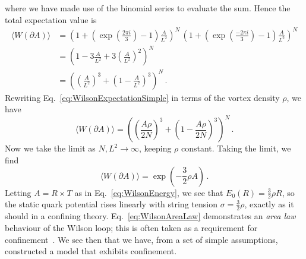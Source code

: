 %
where we have made use of the binomial series to evaluate the sum. Hence the total expectation value is
%
\begin{align}
\langle W(\partial A)\rangle &=\left(1+\left(\exp\left(\frac{2\pi i}{3}\right) - 1\right)\frac{A}{L^2}\right)^N\, \left(1+\left(\exp\left(\frac{-2\pi i}{3}\right) - 1\right)\frac{A}{L^2}\right)^N\nonumber\\
&=\left(1 -3\frac{A}{L^2} + 3\left(\frac{A}{L^2}\right)^2\right)^N\nonumber\\
&= \left(\left(\frac{A}{L^2}\right)^3+\left(1-\frac{A}{L^2}\right)^3\right)^N\, .\label{eq:WilsonExpectationSimple}
\end{align}
%
Rewriting Eq.~\ref{eq:WilsonExpectationSimple} in terms of the vortex density $\rho$, we have
%
\begin{equation}
\langle W(\partial A)\rangle = \left(\left(\frac{A\rho}{2N}\right)^3+\left(1-\frac{A\rho}{2N}\right)^3\right)^N\, .
\end{equation}
%
Now we take the limit as $N,L^2\rightarrow\infty$, keeping $\rho$ constant. Taking the limit, we find
%
\begin{equation}
\langle W(\partial A)\rangle = \exp\left(-\frac{3}{2}\rho A\right)\, .
\label{eq:WilsonAreaLaw}
\end{equation}
%
Letting $A=R\times T$ as in Eq.~\ref{eq:WilsonEnergy}, we see that $E_0(R) = \frac{3}{2}\rho R$, so the static quark potential rises linearly with string tension $\sigma = \frac{3}{2}\rho$, exactly as it should in a confining theory. Eq.~\ref{eq:WilsonAreaLaw} demonstrates an {\it area law} behaviour of the Wilson loop; this is often taken as a requirement for confinement~\cite{DelDebbio:1998luz,Dosch:1988ha}. We see then that we have, from a set of simple assumptions, constructed a model that exhibits confinement.\\

